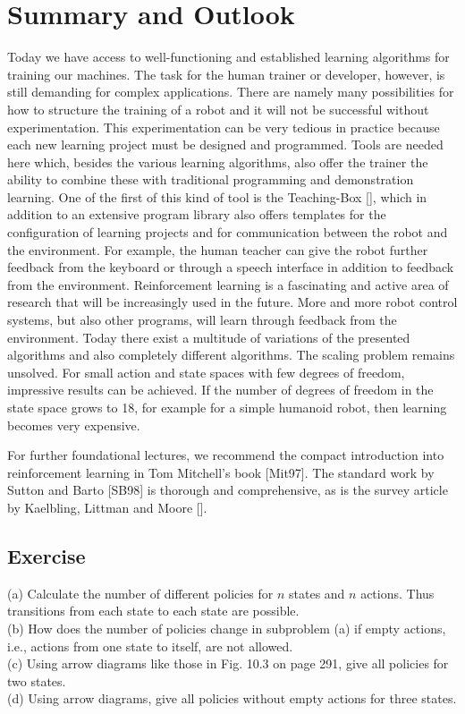 \documentclass[10pt]{book}
\begin{document}
\section{Summary and Outlook}
Today we have access to well-functioning and established learning algorithms for training our machines. The task for the human trainer or developer, however, is still demanding for complex applications. There are namely many possibilities for how to structure the training of a robot and it will not be successful without experimentation. This experimentation can be very tedious in practice because each new learning project must be designed and programmed. Tools are needed here which, besides the various learning algorithms, also offer the trainer the ability to combine these with traditional programming and demonstration learning. One of the first of this kind of tool is the Teaching-Box [\cite{ertel2009teachingbox}], which in addition to an extensive program library also offers templates for the configuration of learning projects and for communication between the robot and the environment. For example, the human teacher can give the robot further feedback from the keyboard or through a speech interface in addition to feedback from the environment.
Reinforcement learning is a fascinating and active area of research that will be increasingly used in the future. More and more robot control systems, but also other programs, will learn through feedback from the environment. Today there exist a multitude of variations of the presented algorithms and also completely different algorithms. The scaling problem remains unsolved. For small action and state spaces with few degrees of freedom, impressive results can be achieved. If the number of degrees of freedom in the state space grows to 18, for example for a simple humanoid robot, then learning becomes very expensive.

For further foundational lectures, we recommend the compact introduction into reinforcement learning in Tom Mitchell's book [Mit97]. The standard work by Sutton and Barto [SB98] is thorough and comprehensive, as is the survey article by Kaelbling, Littman and Moore [\cite{kaelbling1996survey}].

\subsection{Exercise}
(a) Calculate the number of different policies for $n$ states and $n$ actions. Thus transitions from each state to each state are possible.\\
(b) How does the number of policies change in subproblem (a) if empty actions, i.e., actions from one state to itself, are not allowed.\\
(c) Using arrow diagrams like those in Fig. 10.3 on page 291, give all policies for two states.\\
(d) Using arrow diagrams, give all policies without empty actions for three states.
\end{document}
